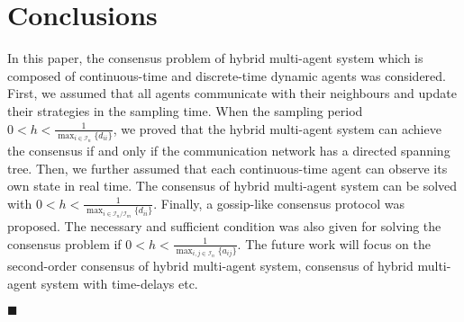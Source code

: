 \documentclass[12pt,draftcls,onecolumn]{IEEEtran}
\newcommand*{\QEDA}{\hfill\ensuremath{\blacksquare}}
\begin{document}
\section{Conclusions}\label{s-Conclusion}

In this paper, the consensus problem of hybrid multi-agent system which is composed of continuous-time and discrete-time dynamic agents was considered. First, we assumed that  all agents communicate with their neighbours and update their strategies in the sampling time. When the sampling period $0<h<\frac{1}{\max_{i\in \mathcal{I}_n}\{d_{ii}\}}$, we proved that the hybrid multi-agent system can achieve the consensus if and only if the communication network has a directed spanning tree. Then, we further assumed that each continuous-time agent can observe its own state in real time. The consensus of hybrid multi-agent system can be solved with $0<h<\frac{1}{\max_{i\in\mathcal{I}_{n}/\mathcal{I}_{m}}\{d_{ii}\}}$. Finally, a gossip-like consensus protocol was proposed. The necessary and sufficient condition was also given for solving the consensus problem if $0<h<\frac{1}{\max_{i,j\in \mathcal{I}_n}\{a_{ij}\}}$. The future work will focus on the second-order consensus of hybrid multi-agent system, consensus of hybrid multi-agent system with time-delays etc.

\QEDA





\ifCLASSOPTIONcaptionsoff
  \newpage
\fi
\end{document}
